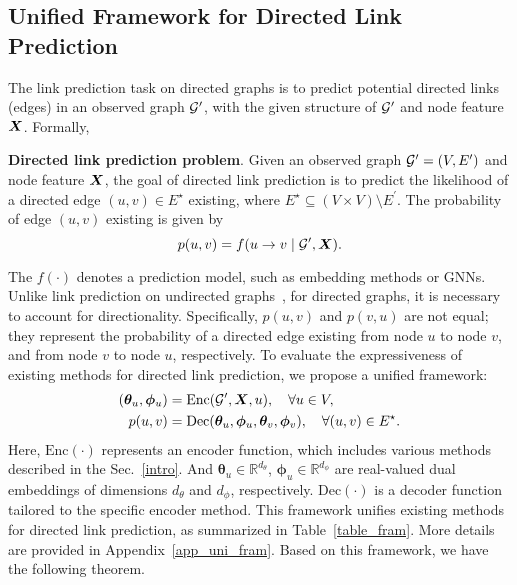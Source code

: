 \subsection{Unified Framework for Directed Link Prediction}
The link prediction task on directed graphs is to predict potential directed links (edges) in an observed graph \( {\mathcal{G}}^{\prime} \), with the given structure of \( {\mathcal{G}}^{\prime} \) and node feature \( {\bm{X}} \). Formally,
\begin{definition}\label{de_dlp}
\textbf{Directed link prediction problem}. Given an observed graph ${\mathcal{G}}^{\prime}=(V, E^{\prime})$ and node feature ${\bm{X}}$, the goal of directed link prediction is to predict the likelihood of a directed edge $(u,v) \in E^{\star}$ existing, where $E^{\star} \subseteq (V \times V) \setminus E^{\prime}$. The probability of edge $(u,v)$ existing is given by 
\begin{equation}
    p(u,v) = f(u \to v \mid {\mathcal{G}}^{\prime}, {\bm{X}}).
\end{equation}
\end{definition}
The $f(\cdot)$ denotes a prediction model, such as embedding methods or GNNs. 
Unlike link prediction on undirected graphs~\cite{zhang2018link}, for directed graphs, it is necessary to account for directionality. Specifically, $p(u,v)$  and $p(v,u)$ are not equal; they represent the probability of a directed edge existing from node $u$ to node $v$, and from node $v$ to node $u$, respectively. To evaluate the expressiveness of existing methods for directed link prediction, we propose a unified framework: 
\begin{align}
    ({\bm \theta}_u, {\bm \phi}_u) &= \mathrm{Enc}({\mathcal{G}}^{\prime}, {\bm{X}}, u), \quad \forall u \in V, \label{eq_encoder} \\
    p(u, v) &= \mathrm{Dec}({\bm \theta}_u, {\bm \phi}_u, {\bm \theta}_v, {\bm \phi}_v), \quad \forall (u, v) \in E^{\star}. \label{eq_decoder}
\end{align}
Here, $\mathrm{Enc}(\cdot)$ represents an encoder function, which includes various methods described in the Sec.~\ref{intro}. %
And ${\bm \theta}_u \in \mathbb{R}^{d_{\theta}}$, ${\bm \phi}_u \in \mathbb{R}^{d_{\phi}}$ are real-valued dual embeddings of dimensions ${d_{\theta}}$ and ${d_{\phi}}$, respectively. $\mathrm{Dec}(\cdot)$ is a decoder function tailored to the specific encoder method. This framework unifies existing methods for directed link prediction, as summarized in Table~\ref{table_fram}. More details are provided in Appendix~\ref{app_uni_fram}. Based on this framework, we have the following theorem.
